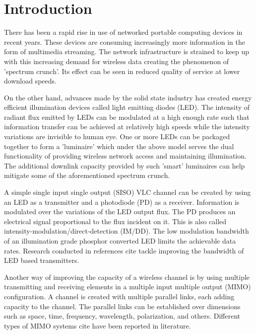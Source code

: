 \section{Introduction}
There has been a rapid rise in use of networked portable computing devices in recent years. These devices are consuming increasingly more information in the form of multimedia streaming. The network infrastructure is strained to keep up with this increasing demand for wireless data creating the phenomenon of 'spectrum crunch'. Its effect can be seen in reduced quality of service at lower download speeds. 

On the other hand, advances made by the solid state industry has created energy efficient illumination devices called light emitting diodes (LED). The intensity of radiant flux emitted by LEDs can be modulated at a high enough rate such that information transfer can be achieved at relatively high speeds while the intensity variations are invisible to human eye. One or more LEDs can be packaged together to form a 'luminaire' which under the above model serves the dual functionality of providing wireless network access and maintaining illumination. The additional downlink capacity provided by such 'smart' luminaires can help mitigate some of the aforementioned spectrum crunch.

A simple single input single output (SISO) VLC channel can be created by using an LED as a transmitter and a photodiode (PD) as a receiver. Information is modulated over the variations of the LED output flux. The PD produces an electrical signal proportional to the flux incident on it. This is also called intensity-modulation/direct-detection (IM/DD). The low modulation bandwidth of an illumination grade phosphor converted LED limits the achievable data rates. Research conducted in references {\color{red}cite} tackle improving the bandwidth of LED based transmitters.

Another way of improving the capacity of a wireless channel is by using multiple transmitting and receiving elements in a multiple input multiple output (MIMO) configuration. A channel is created with multiple parallel links, each adding capacity to the channel. The parallel links can be established over dimensions such as space, time, frequency, wavelength, polarization, and others. Different types of MIMO systems {\color{red}cite} have been reported in literature.


